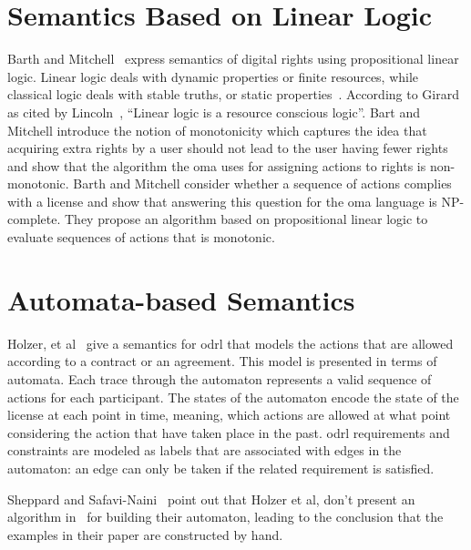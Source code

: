 \section{Semantics Based on Linear Logic}

Barth and Mitchell~\cite{BarthM06} express semantics of digital rights using propositional linear logic. Linear logic deals with dynamic properties or finite resources, while classical logic deals with stable truths, or static properties~\cite{Girard87}. According to Girard as cited by Lincoln~\cite{Lincoln}, ``Linear logic is a resource conscious logic''. Bart and Mitchell introduce the notion of monotonicity which captures the idea that acquiring extra rights by a user should not lead to the user having fewer rights and show that the algorithm the \ac{oma} uses for assigning actions to rights is non-monotonic. Barth and Mitchell consider whether a sequence of actions complies with a license and show that answering this question for the \ac{oma} language is NP-complete. They propose an algorithm based on propositional linear logic to evaluate sequences of actions that is monotonic.

\section{Automata-based Semantics}
Holzer, et al~\cite{Holzer} give a semantics for \ac{odrl} that models the actions that are allowed according to a contract or an agreement. This model is presented in terms of automata. Each trace through the automaton represents a valid sequence of actions for each participant. The states of the automaton encode the state of the license at each point in time, meaning, which actions are allowed at what point considering the action that have taken place in the past. \ac{odrl} requirements and constraints are modeled as labels that are associated with edges in the automaton: an edge can only be taken if the related requirement is satisfied. 

Sheppard and Safavi-Naini~\cite{SheppardS09} point out that Holzer et al, don't present an algorithm in~\cite{Holzer} for building their automaton, leading to the conclusion that the examples in their paper are constructed by hand.

